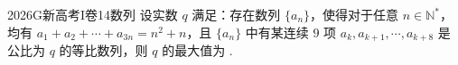 
\begin{problem}{2026}{G}{新高考I卷}{14}{数列}
设实数 $ q $ 满足：存在数列 $ \{a_n\} $，使得对于任意 $ n\in\mathbb{N}^* $，均有 $ a_1+a_2+\cdots+a_{3n}=n^2+n $，且 $ \{a_n\} $ 中有某连续 $ 9 $ 项 $ a_k,a_{k+1},\cdots,a_{k+8} $ 是公比为 $ q $ 的等比数列，则 $ q $ 的最大值为 \underline{\hspace{4em}}.
\end{problem}

\begin{answer}
\end{answer}

\begin{solutions}
\end{solutions}